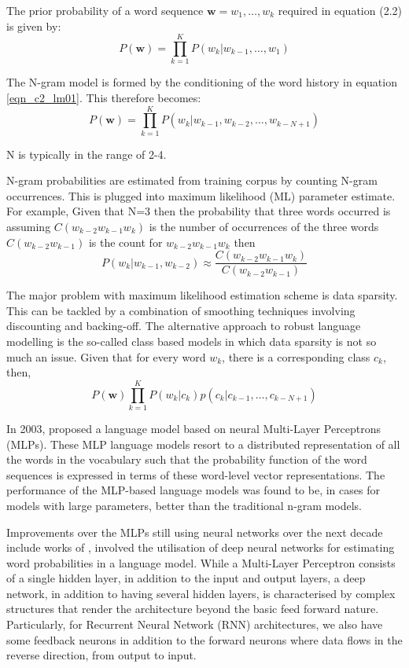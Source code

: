 The prior probability of a word sequence $\mathbf{w}=w_1,\dots,w_k$ required in equation (2.2) is given by:
\begin{equation}P(\mathbf{w})=\prod_{k=1}^KP(w_k|w_{k-1},\dots,w_1)
\label{eqn_c2_lm01}
\end{equation}

The N-gram model is formed by the conditioning of the word history in equation \ref{eqn_c2_lm01}.  This therefore becomes:
\begin{equation}P(\mathbf{w})=\prod_{k=1}^KP(w_k|w_{k-1},w_{k-2},\dots,w_{k-N+1})
\label{eqn_c2_lm02}
\end{equation}

N is typically in the range of 2-4.

N-gram probabilities are estimated from training corpus by counting N-gram occurrences.  This is plugged into maximum likelihood (ML) parameter estimate. For example, Given that N=3 then the probability that three words occurred is assuming $C(w_{k-2}w_{k-1}w_k)$ is the number of occurrences of the three words $C(w_{k-2}w_{k-1})$ is the count for $w_{k-2}w_{k-1}w_k$ then
\begin{equation}
P(w_k|w_{k-1},w_{k-2})\approx\frac{C(w_{k-2}w_{k-1}w_k)}{C(w_{k-2}w_{k-1})}
\label{eqn_c2_lm03}
\end{equation}

The major problem with maximum likelihood estimation scheme is data sparsity. This can be tackled by a combination of smoothing techniques involving discounting and backing-off.  The alternative approach to robust language modelling is the so-called class based models \citep{Brown1992class,Kuhn1990cache} in which data sparsity is not so much an issue.  Given that for every word $w_k$, there is a corresponding class $c_k$, then,
\begin{equation}
P(\mathbf{w})\prod_{k=1}^KP(w_k|c_k)p(c_k|c_{k-1},\dots,c_{k-N+1})
\label{eqn_c2_lm04}
\end{equation}

In 2003,  \cite{bengio2003neural} proposed a language model based on neural Multi-Layer Perceptrons (MLPs). These MLP language models resort to a distributed representation of all the words in the vocabulary such that the probability function of the word sequences is expressed in terms of these word-level vector representations. The performance of the MLP-based language models was found to be, in cases for models with large parameters,  better than the traditional n-gram models.

Improvements over the MLPs still using neural networks over the next decade include works of \cite{mikolov2011empirical,sutskever2014sequence,luong2013better}, involved the utilisation of deep neural networks for estimating word probabilities in a language model.  While a Multi-Layer Perceptron consists of a single hidden layer, in addition to the input and output layers, a deep network, in addition to having several hidden layers, is characterised by complex structures that render the architecture beyond the basic feed forward nature. Particularly, for Recurrent Neural Network (RNN) architectures, we also have some feedback neurons in addition to the forward neurons where data flows in the reverse direction, from output to input. 

